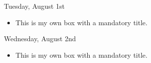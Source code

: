 \documentclass[11pt]{article}
\begin{document}
\normalsize\begin{indigobox}{Tuesday, August 1st}
    \begin{itemize}         
        \item This is my own box with a mandatory title.     
    \end{itemize}
\end{indigobox}

\begin{center}
    \vspace{-0.25em}
    \hspace{0.2cm}
    \vspace{-0.4em}
\end{center}

\normalsize\begin{indigobox}{Wednesday, August 2nd}
    \begin{itemize}         
        \item This is my own box with a mandatory title.     
    \end{itemize}
\end{indigobox}
\end{document}
